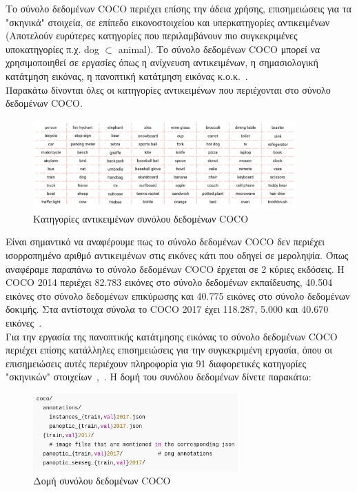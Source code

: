\documentclass[12pt]{article}
\numberwithin{equation}{section}
\begin{document}
Το σύνολο δεδομένων COCO περιέχει επίσης την άδεια χρήσης, επισημειώσεις για τα "σκηνικά" στοιχεία, σε επίπεδο εικονοστοιχείου και υπερκατηγορίες αντικειμένων (Αποτελούν ευρύτερες κατηγορίες που περιλαμβάνουν πιο συγκεκριμένες υποκατηγορίες π.χ. dog \(\subset\) animal). Το σύνολο δεδομένων COCO μπορεί να χρησιμοποιηθεί σε εργασίες όπως η ανίχνευση αντικειμένων, η σημασιολογική κατάτμηση εικόνας, η πανοπτική κατάτμηση εικόνας κ.ο.κ.~\cite{shah2023coco}. \\

\noindent Παρακάτω δίνονται όλες οι κατηγορίες αντικειμένων που περιέχονται στο σύνολο δεδομένων COCO.

\begin{figure}[h!]
  \centering
  \includegraphics[width=0.9\textwidth]{images/coco.png} %
  \caption{Κατηγορίες αντικειμένων συνόλου δεδομένων COCO}
  \label{figure 5}
\end{figure}

\noindent Είναι σημαντικό να αναφέρουμε πως το σύνολο δεδομένων COCO δεν περιέχει ισορροπημένο αριθμό αντικειμένων στις εικόνες κάτι που οδηγεί σε μεροληψία. Όπως αναφέραμε παραπάνω το σύνολο δεδομένων COCO έρχεται σε 2 κύριες εκδόσεις. Η COCO 2014 περιέχει 82.783 εικόνες στο σύνολο δεδομένων εκπαίδευσης, 40.504 εικόνες στο σύνολο δεδομένων επικύρωσης και 40.775 εικόνες στο σύνολο δεδομένων δοκιμής. Στα αντίστοιχα σύνολα το COCO 2017 έχει 118.287, 5.000 και 40.670 εικόνες~\cite{fan2021tao}. \\

Για την εργασία της πανοπτικής κατάτμησης εικόνας το σύνολο δεδομένων COCO περιέχει επίσης κατάλληλες επισημειώσεις για την συγκεκριμένη εργασία, όπου οι επισημειώσεις αυτές περιέχουν πληροφορία για 91 διαφορετικές κατηγορίες "σκηνικών" στοιχείων~\cite{lin2015microsoftcococommonobjects},~\cite{shah2023coco}. Η δομή του συνόλου δεδομένων δίνετε παρακάτω: \\

\begin{figure}[h!]
  \centering
  \includegraphics[width=0.7\textwidth]{images/coco_format.png} %
  \caption{Δομή συνόλου δεδομένων COCO}
  \label{figure 6}
\end{figure}
\end{document}
